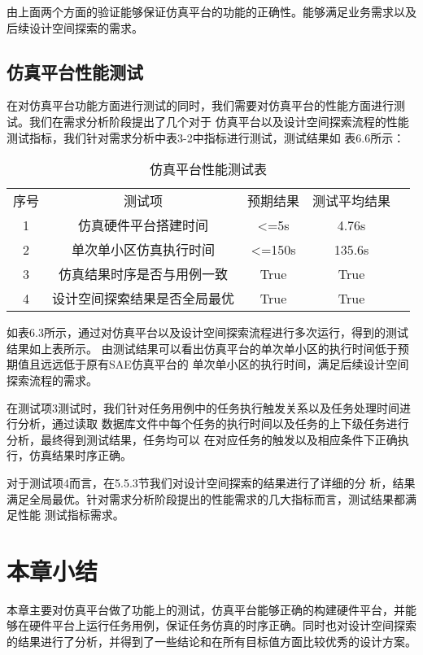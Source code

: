 由上面两个方面的验证能够保证仿真平台的功能的正确性。能够满足业务需求以及后续设计空间探索的需求。

\subsection{仿真平台性能测试}
在对仿真平台功能方面进行测试的同时，我们需要对仿真平台的性能方面进行测试。我们在需求分析阶段提出了几个对于
仿真平台以及设计空间探索流程的性能测试指标，我们针对需求分析中表3-2中指标进行测试，测试结果如
表6.6所示：

\begin{table}[htb]
    \centering\normalsize
    \caption{仿真平台性能测试表}
    \begin{tabular}{|c|c|c|c|l}
    \cline{1-4}
    序号 & 测试项            & 预期结果              & 测试平均结果   &  \\ \cline{1-4}
    1  & 仿真硬件平台搭建时间     & \textless{}=5s    & 4.76s  &  \\ \cline{1-4}
    2  & 单次单小区仿真执行时间    & \textless{}=150s   & 135.6s &  \\ \cline{1-4}
    3  & 仿真结果时序是否与用例一致  & True              & True   &  \\ \cline{1-4}
    4  & 设计空间探索结果是否全局最优 & True              & True   &  \\ \cline{1-4}
    \end{tabular}
    \end{table}

如表6.3所示，通过对仿真平台以及设计空间探索流程进行多次运行，得到的测试结果如上表所示。
由测试结果可以看出仿真平台的单次单小区的执行时间低于预期值且远远低于原有SAE仿真平台的
单次单小区的执行时间，满足后续设计空间探索流程的需求。

在测试项3测试时，我们针对任务用例中的任务执行触发关系以及任务处理时间进行分析，通过读取
数据库文件中每个任务的执行时间以及任务的上下级任务进行分析，最终得到测试结果，任务均可以
在对应任务的触发以及相应条件下正确执行，仿真结果时序正确。

对于测试项4而言，在5.5.3节我们对设计空间探索的结果进行了详细的分
析，结果满足全局最优。针对需求分析阶段提出的性能需求的几大指标而言，测试结果都满足性能
测试指标需求。

\section{本章小结}

本章主要对仿真平台做了功能上的测试，仿真平台能够正确的构建硬件平台，并能够在硬件平台上运行任务用例，保证任务仿真的时序正确。同时也对设计空间探索的结果进行了分析，并得到了一些结论和在所有目标值方面比较优秀的设计方案。